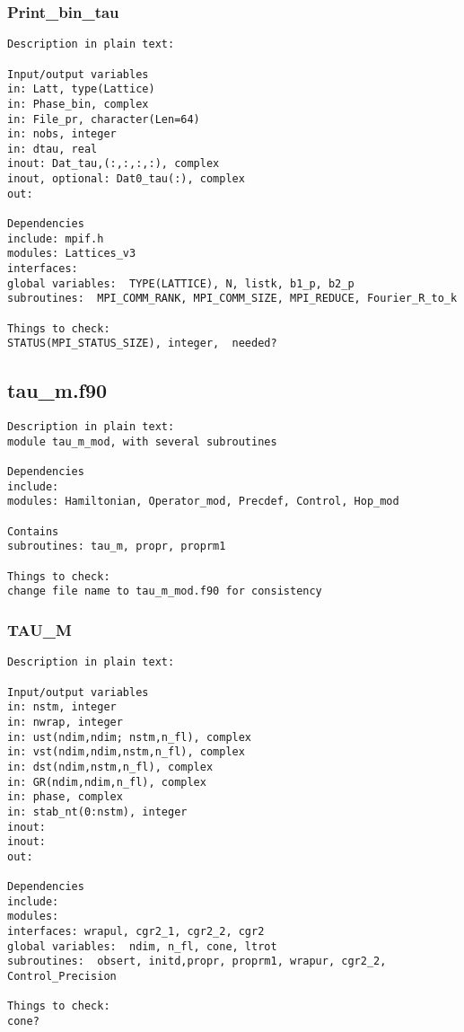 \subsubsection{Print\_bin\_tau}
\begin{verbatim}
Description in plain text:

Input/output variables
in: Latt, type(Lattice)
in: Phase_bin, complex
in: File_pr, character(Len=64)
in: nobs, integer
in: dtau, real
inout: Dat_tau,(:,:,:,:), complex
inout, optional: Dat0_tau(:), complex
out:

Dependencies
include: mpif.h
modules: Lattices_v3
interfaces: 
global variables:  TYPE(LATTICE), N, listk, b1_p, b2_p
subroutines:  MPI_COMM_RANK, MPI_COMM_SIZE, MPI_REDUCE, Fourier_R_to_k

Things to check:
STATUS(MPI_STATUS_SIZE), integer,  needed?
\end{verbatim}


\clearpage
\subsection{tau\_m.f90}
\begin{verbatim}
Description in plain text:
module tau_m_mod, with several subroutines

Dependencies
include: 
modules: Hamiltonian, Operator_mod, Precdef, Control, Hop_mod

Contains
subroutines: tau_m, propr, proprm1

Things to check:
change file name to tau_m_mod.f90 for consistency
\end{verbatim}

\subsubsection{TAU\_M}
\begin{verbatim}
Description in plain text:

Input/output variables
in: nstm, integer
in: nwrap, integer
in: ust(ndim,ndim; nstm,n_fl), complex
in: vst(ndim,ndim,nstm,n_fl), complex
in: dst(ndim,nstm,n_fl), complex
in: GR(ndim,ndim,n_fl), complex
in: phase, complex
in: stab_nt(0:nstm), integer
inout: 
inout: 
out:

Dependencies
include: 
modules:
interfaces: wrapul, cgr2_1, cgr2_2, cgr2
global variables:  ndim, n_fl, cone, ltrot
subroutines:  obsert, initd,propr, proprm1, wrapur, cgr2_2, Control_Precision

Things to check:
cone?
\end{verbatim}

